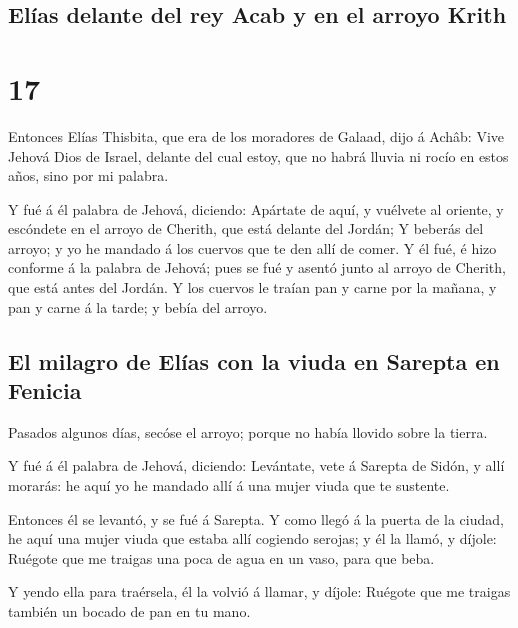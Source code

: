 \hypertarget{eluxedas-delante-del-rey-acab-y-en-el-arroyo-krith}{%
\subsection{Elías delante del rey Acab y en el arroyo
Krith}\label{eluxedas-delante-del-rey-acab-y-en-el-arroyo-krith}}

\hypertarget{section-16}{%
\section{17}\label{section-16}}

 Entonces Elías Thisbita, que era de los moradores de
Galaad, dijo á Achâb: Vive Jehová Dios de Israel, delante del cual
estoy, que no habrá lluvia ni rocío en estos años, sino por mi palabra.

 Y fué á él palabra de Jehová, diciendo: 
Apártate de aquí, y vuélvete al oriente, y escóndete en el arroyo de
Cherith, que está delante del Jordán;  Y beberás del
arroyo; y yo he mandado á los cuervos que te den allí de comer.
 Y él fué, é hizo conforme á la palabra de Jehová; pues se
fué y asentó junto al arroyo de Cherith, que está antes del Jordán.
 Y los cuervos le traían pan y carne por la mañana, y pan
y carne á la tarde; y bebía del arroyo.

\hypertarget{el-milagro-de-eluxedas-con-la-viuda-en-sarepta-en-fenicia}{%
\subsection{El milagro de Elías con la viuda en Sarepta en
Fenicia}\label{el-milagro-de-eluxedas-con-la-viuda-en-sarepta-en-fenicia}}

 Pasados algunos días, secóse el arroyo; porque no había
llovido sobre la tierra.

 Y fué á él palabra de Jehová, diciendo: 
Levántate, vete á Sarepta de Sidón, y allí morarás: he aquí yo he
mandado allí á una mujer viuda que te sustente.

 Entonces él se levantó, y se fué á Sarepta. Y como llegó
á la puerta de la ciudad, he aquí una mujer viuda que estaba allí
cogiendo serojas; y él la llamó, y díjole: Ruégote que me traigas una
poca de agua en un vaso, para que beba.

 Y yendo ella para traérsela, él la volvió á llamar, y
díjole: Ruégote que me traigas también un bocado de pan en tu mano.

